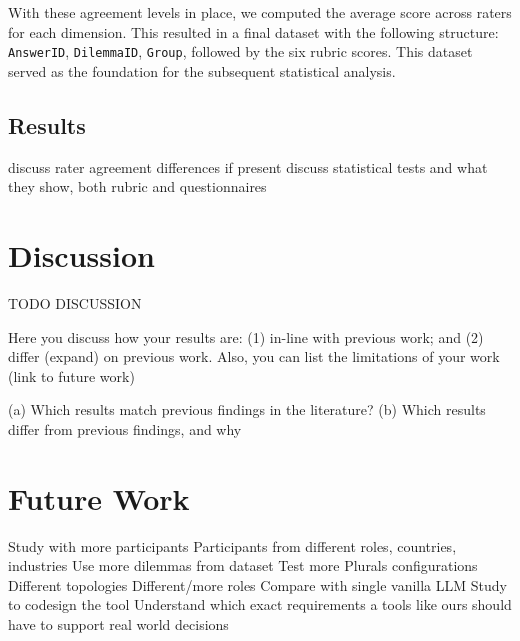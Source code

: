 \documentclass[sigconf, authorversion, nonacm, screen]{acmart}
\begin{document}
With these agreement levels in place, we computed the average score across raters for each dimension. This resulted in a final dataset with the following structure: \texttt{AnswerID}, \texttt{DilemmaID}, \texttt{Group}, followed by the six rubric scores. This dataset served as the foundation for the subsequent statistical analysis.



\subsection{Results}

discuss rater agreement differences if present
discuss statistical tests and what they show, both rubric and questionnaires

\section{Discussion}
TODO DISCUSSION

Here you discuss how your results are: (1) in-line with previous work; and (2) differ
(expand) on previous work. Also, you can list the limitations of your work (link to future work)

(a) Which results match previous findings in the literature?
(b) Which results differ from previous findings, and why

\section{Future Work}

Study with more participants
Participants from different roles, countries, industries
Use more dilemmas from dataset
Test more Plurals configurations
Different topologies
Different/more roles
Compare with single vanilla LLM
Study to codesign the tool
Understand which exact requirements a tools like ours should have to support real world decisions

\end{document}
